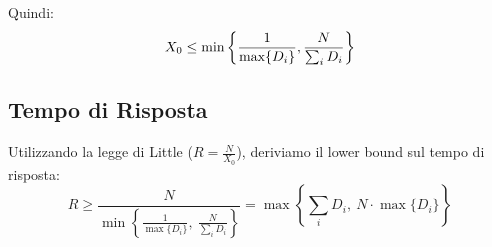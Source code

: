 \documentclass[11pt,a4paper]{article}
\begin{document}
    Quindi:
    \begin{equation}
        X_0 \le \text{min}\left\{\frac{1}{\text{max}\{D_i\}},\space\frac{N}{\sum_i{D_i}}\right\}
    \end{equation}

    \subsection{Tempo di Risposta}
    Utilizzando la legge di Little ($R=\frac{N}{X_0}$), deriviamo il lower bound sul tempo di risposta:
    \begin{equation}
        R \ge \frac{N}{\min\left\{ \frac{1}{\max\{D_i\}}, \ \frac{N}{\sum_{i} D_i} \right\}} = \max\left\{ \sum_{i} D_i, \ N \cdot \max\{D_i\} \right\}
    \end{equation}

    
\end{document}
